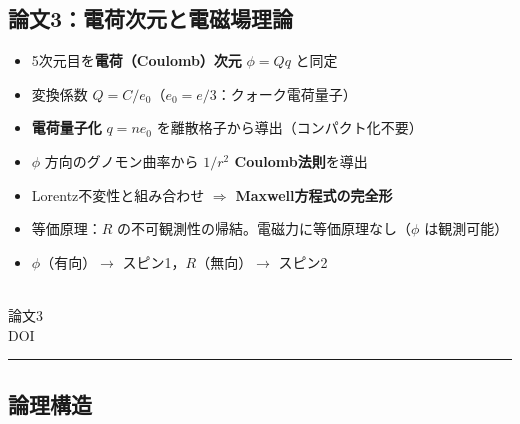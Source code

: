 \documentclass[11pt,a4paper]{ltjsarticle}
\begin{document}
\noindent\begin{minipage}[t]{0.82\textwidth}
\subsection*{論文3：電荷次元と電磁場理論}
\vspace{-6pt}
\begin{itemize}
\item 5次元目を\textbf{電荷（Coulomb）次元} $\phi = Qq$ と同定
\item 変換係数 $Q = C/e_0$（$e_0 = e/3$：クォーク電荷量子）
\item \textbf{電荷量子化} $q = n e_0$ を離散格子から導出（コンパクト化不要）
\item $\phi$ 方向のグノモン曲率から \textbf{$1/r^2$ Coulomb法則}を導出
\item Lorentz不変性と組み合わせ $\Longrightarrow$ \textbf{Maxwell方程式の完全形}
\item 等価原理：$R$ の不可観測性の帰結。電磁力に等価原理なし（$\phi$ は観測可能）
\item $\phi$（有向）$\to$ スピン1，$R$（無向）$\to$ スピン2
\end{itemize}
\end{minipage}%
\hfill
\begin{minipage}[t]{0.15\textwidth}
\vspace{0pt}
\centering
{}\\[3pt]
{\scriptsize 論文3\\DOI}
\end{minipage}

\vspace{14pt}
\hrule
\vspace{10pt}

\subsection*{論理構造}

\vspace{-4pt}
\begin{center}
\end{center}
\end{document}

